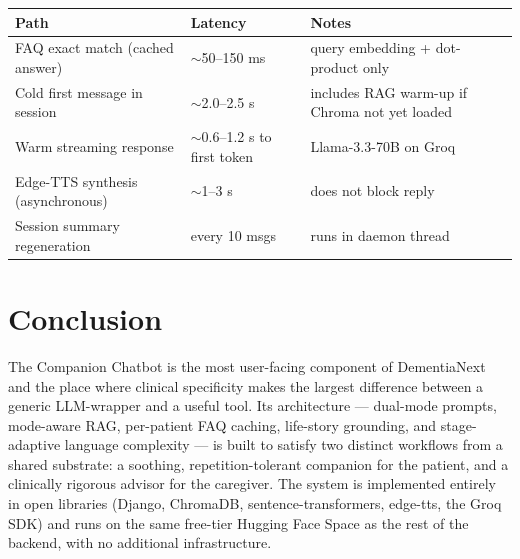 \documentclass[11pt, a4paper]{article}
\begin{document}
\begin{center}
\small
\begin{tabular}{>{\raggedright\arraybackslash}p{6.0cm} >{\raggedleft\arraybackslash}p{2.8cm} >{\raggedright\arraybackslash}p{6.5cm}}
\toprule
\textbf{Path} & \textbf{Latency} & \textbf{Notes} \\
\midrule
FAQ exact match (cached answer) & $\sim$50--150 ms & query embedding + dot-product only \\
Cold first message in session & $\sim$2.0--2.5 s & includes RAG warm-up if Chroma not yet loaded \\
Warm streaming response & $\sim$0.6--1.2 s to first token & Llama-3.3-70B on Groq \\
Edge-TTS synthesis (asynchronous) & $\sim$1--3 s & does not block reply \\
Session summary regeneration & every 10 msgs & runs in daemon thread \\
\bottomrule
\end{tabular}
\end{center}

\section{Conclusion}

The Companion Chatbot is the most user-facing component of DementiaNext and the place where clinical specificity makes the largest difference between a generic LLM-wrapper and a useful tool. Its architecture --- dual-mode prompts, mode-aware RAG, per-patient FAQ caching, life-story grounding, and stage-adaptive language complexity --- is built to satisfy two distinct workflows from a shared substrate: a soothing, repetition-tolerant companion for the patient, and a clinically rigorous advisor for the caregiver. The system is implemented entirely in open libraries (Django, ChromaDB, sentence-transformers, edge-tts, the Groq SDK) and runs on the same free-tier Hugging Face Space as the rest of the backend, with no additional infrastructure.
\end{document}
